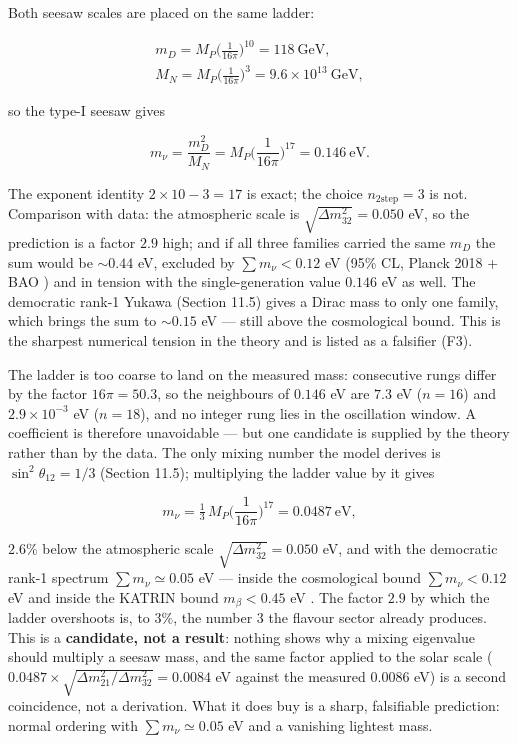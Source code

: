 \documentclass[aps,prd,twocolumn,amsmath,amssymb,superscriptaddress,nofootinbib,floatfix]{revtex4-2}
\begin{document}
Both seesaw scales are placed on the same ladder:

\begin{multline}
    m_D = M_P\Big(\frac{1}{16\pi}\Big)^{10} = 118\ \mathrm{GeV},\qquad \\
    M_N = M_P\Big(\frac{1}{16\pi}\Big)^{3} = 9.6\times10^{13}\ \mathrm{GeV},
\end{multline}

so the type-I seesaw gives

\[m_\nu = \frac{m_D^2}{M_N} = M_P\Big(\frac{1}{16\pi}\Big)^{17} = 0.146\ \mathrm{eV}.\]

The exponent identity \(2\times10 - 3 = 17\) is exact; the choice
\(n_{2\text{step}} = 3\) is not. Comparison with data: the atmospheric
scale is \(\sqrt{\Delta m^2_{32}} = 0.050\) eV, so the prediction is a
factor \(2.9\) high; and if all three families carried the same \(m_D\)
the sum would be \(\sim 0.44\) eV, excluded by \(\sum m_\nu < 0.12\) eV
(95\% CL, Planck 2018 + BAO \cite{ref14}) and in tension with the
single-generation value \(0.146\) eV as well. The democratic rank-1
Yukawa (Section 11.5) gives a Dirac mass to only one family, which
brings the sum to \(\sim 0.15\) eV --- still above the cosmological
bound. This is the sharpest numerical tension in the theory and is
listed as a falsifier (F3).

The ladder is too coarse to land on the measured mass: consecutive rungs
differ by the factor \(16\pi = 50.3\), so the neighbours of \(0.146\) eV
are \(7.3\) eV (\(n = 16\)) and \(2.9\times10^{-3}\) eV (\(n = 18\)),
and no integer rung lies in the oscillation window. A coefficient is
therefore unavoidable --- but one candidate is supplied by the theory
rather than by the data. The only mixing number the model derives is
\(\sin^2\theta_{12} = 1/3\) (Section 11.5); multiplying the ladder value
by it gives

\[m_\nu = \tfrac13\,M_P\Big(\frac{1}{16\pi}\Big)^{17} = 0.0487\ \mathrm{eV},\]

\(2.6\%\) below the atmospheric scale \(\sqrt{\Delta m^2_{32}} = 0.050\)
eV, and with the democratic rank-1 spectrum \(\sum m_\nu \simeq 0.05\)
eV --- inside the cosmological bound \(\sum m_\nu < 0.12\) eV and inside
the KATRIN bound \(m_\beta < 0.45\) eV \cite{ref16}. The factor \(2.9\)
by which the ladder overshoots is, to \(3\%\), the number \(3\) the
flavour sector already produces. This is a \textbf{candidate, not a
result}: nothing shows why a mixing eigenvalue should multiply a seesaw
mass, and the same factor applied to the solar scale
(\(0.0487\times\sqrt{\Delta m^2_{21}/\Delta m^2_{32}} = 0.0084\) eV
against the measured \(0.0086\) eV) is a second coincidence, not a
derivation. What it does buy is a sharp, falsifiable prediction: normal
ordering with \(\sum m_\nu \simeq 0.05\) eV and a vanishing lightest
mass.
\end{document}
